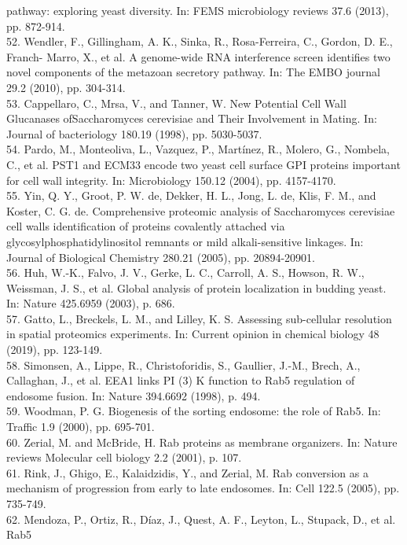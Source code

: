 \documentclass[12pt,english]{article}
\begin{document}
pathway: exploring yeast diversity. In: FEMS microbiology reviews 37.6 (2013),
pp. 872-914.
\\
52. Wendler, F., Gillingham, A. K., Sinka, R., Rosa-Ferreira, C., Gordon, D. E., Franch-
Marro, X., et al. A genome-wide RNA interference screen identifies two novel components
of the metazoan secretory pathway. In: The EMBO journal 29.2 (2010), pp. 304-314.
\\
53. Cappellaro, C., Mrsa, V., and Tanner, W. New Potential Cell Wall Glucanases ofSaccharomyces
cerevisiae and Their Involvement in Mating. In: Journal of bacteriology
180.19 (1998), pp. 5030-5037.
\\
54. Pardo, M., Monteoliva, L., Vazquez, P., Martínez, R., Molero, G., Nombela, C., et al.
PST1 and ECM33 encode two yeast cell surface GPI proteins important for cell wall
integrity. In: Microbiology 150.12 (2004), pp. 4157-4170.
\\
55. Yin, Q. Y., Groot, P. W. de, Dekker, H. L., Jong, L. de, Klis, F. M., and Koster,
C. G. de. Comprehensive proteomic analysis of Saccharomyces cerevisiae cell walls
identification of proteins covalently attached via glycosylphosphatidylinositol remnants
or mild alkali-sensitive linkages. In: Journal of Biological Chemistry 280.21 (2005),
pp. 20894-20901.
\\
56. Huh, W.-K., Falvo, J. V., Gerke, L. C., Carroll, A. S., Howson, R. W., Weissman, J. S.,
et al. Global analysis of protein localization in budding yeast. In: Nature 425.6959
(2003), p. 686.
\\
57. Gatto, L., Breckels, L. M., and Lilley, K. S. Assessing sub-cellular resolution in spatial
proteomics experiments. In: Current opinion in chemical biology 48 (2019), pp. 123-149.
\\
58. Simonsen, A., Lippe, R., Christoforidis, S., Gaullier, J.-M., Brech, A., Callaghan, J.,
et al. EEA1 links PI (3) K function to Rab5 regulation of endosome fusion. In: Nature
394.6692 (1998), p. 494.
\\
59. Woodman, P. G. Biogenesis of the sorting endosome: the role of Rab5. In: Traffic 1.9
(2000), pp. 695-701.
\\
60. Zerial, M. and McBride, H. Rab proteins as membrane organizers. In: Nature reviews
Molecular cell biology 2.2 (2001), p. 107.
\\
61. Rink, J., Ghigo, E., Kalaidzidis, Y., and Zerial, M. Rab conversion as a mechanism of
progression from early to late endosomes. In: Cell 122.5 (2005), pp. 735-749.
\\
62. Mendoza, P., Ortiz, R., Díaz, J., Quest, A. F., Leyton, L., Stupack, D., et al. Rab5
\end{document}
